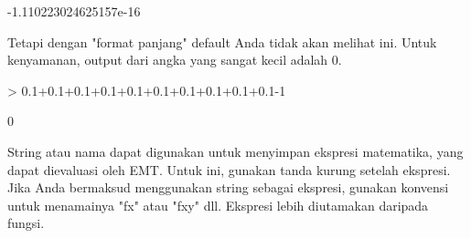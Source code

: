 \documentclass[a4paper,10pt]{article}
\begin{document}
\begin{eulernotebook}
\begin{eulercomment}
\begin{eulercomment}
\begin{euleroutput}
   -1.110223024625157e-16 
\end{euleroutput}
\begin{eulercomment}
Tetapi dengan "format panjang" default Anda tidak akan melihat ini.
Untuk kenyamanan, output dari angka yang sangat kecil adalah 0.
\end{eulercomment}
\begin{eulerprompt}
> 0.1+0.1+0.1+0.1+0.1+0.1+0.1+0.1+0.1+0.1-1
\end{eulerprompt}
\begin{euleroutput}
  0
\end{euleroutput}
\begin{eulercomment}
String atau nama dapat digunakan untuk menyimpan ekspresi matematika,
yang dapat dievaluasi oleh EMT. Untuk ini, gunakan tanda kurung
setelah ekspresi. Jika Anda bermaksud menggunakan string sebagai
ekspresi, gunakan konvensi untuk menamainya "fx" atau "fxy" dll.
Ekspresi lebih diutamakan daripada fungsi.


\end{eulercomment}
\end{eulercomment}
\end{eulercomment}
\end{eulernotebook}
\end{document}
